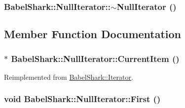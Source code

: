 \hypertarget{class_babel_shark_1_1_null_iterator_74cddf876859c03f0a3525d839e821bf}{
\subsubsection[{$\sim$NullIterator}]{\setlength{\rightskip}{0pt plus 5cm}BabelShark::NullIterator::$\sim$NullIterator ()}}
\label{class_babel_shark_1_1_null_iterator_74cddf876859c03f0a3525d839e821bf}




\subsection{Member Function Documentation}
\hypertarget{class_babel_shark_1_1_null_iterator_938998731797e1bc1b465d6aeb4fc129}{
\subsubsection[{CurrentItem}]{$\ast$ BabelShark::NullIterator::CurrentItem ()}}
\label{class_babel_shark_1_1_null_iterator_938998731797e1bc1b465d6aeb4fc129}




Reimplemented from \hyperlink{class_babel_shark_1_1_iterator_47a9ff22fbd2dc6fdc935f22a7560ce1}{BabelShark::Iterator}.\hypertarget{class_babel_shark_1_1_null_iterator_fed04b8defc217356d99cee6bbcfd97f}{
\subsubsection[{First}]{\setlength{\rightskip}{0pt plus 5cm}void BabelShark::NullIterator::First ()}}
\label{class_babel_shark_1_1_null_iterator_fed04b8defc217356d99cee6bbcfd97f}





